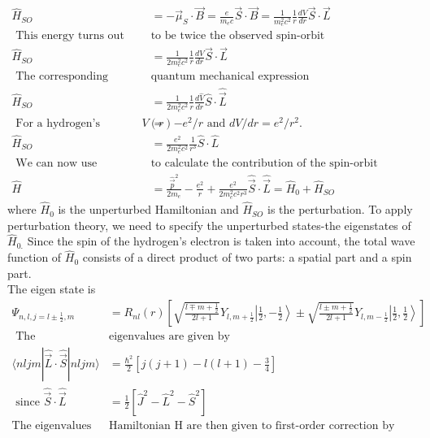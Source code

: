 	$$
	\begin{aligned}
	\hat{H}_{S O}&=-\vec{\mu}_{S} \cdot \vec{B}=\frac{e}{m_{e} c} \vec{S} \cdot \vec{B}=\frac{1}{m_{e}^{2} c^{2}} \frac{1}{r} \frac{d V}{d r} \vec{S} \cdot \vec{L}\\
	\text{ This energy turns out }&\text{to be twice the observed spin-orbit interaction.Therefore}\\
	\hat{H}_{S O}&=\frac{1}{2 m_{e}^{2} c^{2}} \frac{1}{r} \frac{d V}{d r} \vec{S} \cdot \vec{L}\\
	\text{ The corresponding }&\text{quantum mechanical expression}\\
\hat{H}_{S O}&=\frac{1}{2 m_{e}^{2} c^{2}} \frac{1}{r} \frac{d \hat{V}}{d r} \hat{S} \cdot \hat{\vec{L}}\\
\text{	For a hydrogen's electron, $V(r)$}&=\text{	$-e^{2} / r$ and $d V / d r=e^{2} / r^{2}$.}\\
	\hat{H}_{S O}&=\frac{e^{2}}{2 m_{e}^{2} c^{2}} \frac{1}{r^{3}} \hat{S} \cdot \hat{L}\\
\text{	We can now use perturbation theory }&\text{to calculate the contribution of the spin-orbit interaction in a hydrogen atom:}\\
	\hat{H}&=\frac{\hat{\vec{p}}^{2}}{2 m_{e}}-\frac{e^{2}}{r}+\frac{e^{2}}{2 m_{e}^{2} c^{2} r^{3}} \hat{\vec{S}} \cdot \hat{\vec{L}}=\hat{H}_{0}+\hat{H}_{S O}
\end{aligned}
$$
where $\hat{H}_{0}$ is the unperturbed Hamiltonian and $\hat{H}_{S O}$ is the perturbation. To apply perturbation theory, we need to specify the unperturbed states-the eigenstates of $\hat{H}_{0 .}$ Since the spin of the hydrogen's electron is taken into account, the total wave function of $\hat{H}_{0}$ consists of a direct product of two parts: a spatial part and a spin part. \\
The eigen state is 
	$$
	\begin{aligned}
	\Psi_{n, l, j=l \pm \frac{1}{2}, m}&=R_{n l}(r)\left[\sqrt{\frac{l \mp m+\frac{1}{2}}{2 l+1}} Y_{l, m+\frac{1}{2}}\left|\frac{1}{2},-\frac{1}{2}\right\rangle \pm \sqrt{\frac{l \pm m+\frac{1}{2}}{2 l+1}} Y_{l, m-\frac{1}{2}}\left|\frac{1}{2}, \frac{1}{2}\right\rangle\right]\\
\text{	The corresponding }&\text{eigenvalues are given by}\\
	\langle n l j m|\hat{\vec{L}} \cdot \hat{\vec{S}}| n l j m\rangle&=\frac{\hbar^{2}}{2}\left[j(j+1)-l(l+1)-\frac{3}{4}\right]\\
	\text { since } \hat{\vec{S}} \cdot \hat{\vec{L}}&=\frac{1}{2}\left[\hat{J}^{2}-\hat{L}^{2}-\hat{S}^{2}\right]\\
	\text{The eigenvalues of total }&\text{Hamiltonian H are then given to first-order correction by}
\end{aligned}
$$
